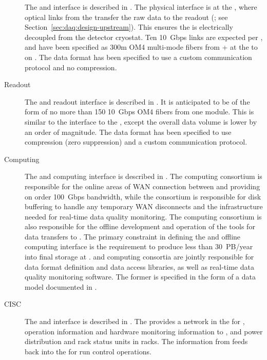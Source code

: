 \begin{description}
\item[ ] The  and   interface is described in
. The physical interface is at the , where optical links from the  transfer
the raw  data to the   readout (; see
Section~\ref{sec:daq:design-upstream}). This ensures the  is electrically decoupled from the detector
cryostat. Ten \SI{10}{Gbps} links are expected per , and have
been specified as 300m OM4 multi-mode fibers from + at the  to
 on . The data format has been specified
to use a custom communication protocol and no
compression.

\item[ Readout] The  and  readout interface is described in
. It is anticipated to
be of the form of no more than 150  \SI{10}{Gbps} OM4 fibers from one  module. 
This
is similar to the interface to the  , except the overall
data volume is lower by an order of magnitude. The data format has been specified to use
compression (zero suppression) and a custom communication protocol.

\item[Computing] The  and computing interface is described in .
 The computing consortium
 is responsible for the online areas of WAN connection between \surf and
\fnal providing on order \SI{100}{Gbps} bandwidth, while the  consortium is responsible for disk buffering
to handle any temporary WAN disconnects and the infrastructure needed
for real-time data quality monitoring.  The computing consortium 
is also
responsible for the offline development and operation of the tools for data
transfers to \fnal. The primary
constraint in defining the  and offline computing interface is the
requirement to produce less than \SI{30}{PB/year} 
into final storage at
\fnal.  and
computing consortia are jointly responsible for data
format definition and data access libraries, as well as real-time data
quality monitoring software. The former is specified in the form of a 
data model documented in .

\item[CISC] The  and  interface is described in
. The  provides a network in the  for ,  operation information and hardware
monitoring information to , and power distribution and
rack status units in  racks. The information from 
feeds back into the  for run control operations.


\end{description}
